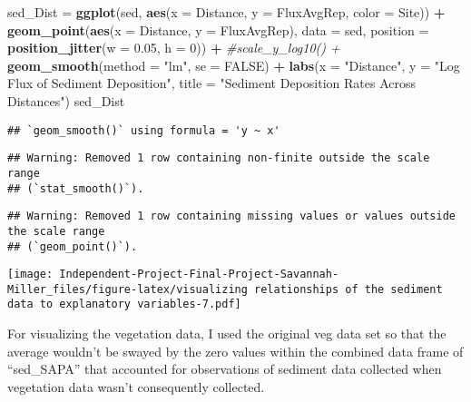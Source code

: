 \documentclass[
]{article}
\newenvironment{Shaded}{\begin{snugshade}}{\end{snugshade}}
\newcommand{\AttributeTok}[1]{\textcolor[rgb]{0.13,0.29,0.53}{#1}}
\newcommand{\CommentTok}[1]{\textcolor[rgb]{0.56,0.35,0.01}{\textit{#1}}}
\newcommand{\ConstantTok}[1]{\textcolor[rgb]{0.56,0.35,0.01}{#1}}
\newcommand{\DecValTok}[1]{\textcolor[rgb]{0.00,0.00,0.81}{#1}}
\newcommand{\FloatTok}[1]{\textcolor[rgb]{0.00,0.00,0.81}{#1}}
\newcommand{\FunctionTok}[1]{\textcolor[rgb]{0.13,0.29,0.53}{\textbf{#1}}}
\newcommand{\NormalTok}[1]{#1}
\newcommand{\OtherTok}[1]{\textcolor[rgb]{0.56,0.35,0.01}{#1}}
\newcommand{\SpecialCharTok}[1]{\textcolor[rgb]{0.81,0.36,0.00}{\textbf{#1}}}
\newcommand{\StringTok}[1]{\textcolor[rgb]{0.31,0.60,0.02}{#1}}
\begin{document}
\begin{Shaded}
\begin{Highlighting}[]
\NormalTok{sed\_Dist }\OtherTok{=} \FunctionTok{ggplot}\NormalTok{(sed, }\FunctionTok{aes}\NormalTok{(}\AttributeTok{x =}\NormalTok{ Distance, }\AttributeTok{y =}\NormalTok{ FluxAvgRep, }\AttributeTok{color =}\NormalTok{ Site)) }\SpecialCharTok{+} 
  \FunctionTok{geom\_point}\NormalTok{(}\FunctionTok{aes}\NormalTok{(}\AttributeTok{x =}\NormalTok{ Distance, }\AttributeTok{y =}\NormalTok{ FluxAvgRep), }\AttributeTok{data =}\NormalTok{ sed, }\AttributeTok{position =} \FunctionTok{position\_jitter}\NormalTok{(}\AttributeTok{w =} \FloatTok{0.05}\NormalTok{, }\AttributeTok{h =} \DecValTok{0}\NormalTok{)) }\SpecialCharTok{+}
  \CommentTok{\#scale\_y\_log10() + }
   \FunctionTok{geom\_smooth}\NormalTok{(}\AttributeTok{method =} \StringTok{"lm"}\NormalTok{, }\AttributeTok{se =} \ConstantTok{FALSE}\NormalTok{) }\SpecialCharTok{+}
  \FunctionTok{labs}\NormalTok{(}\AttributeTok{x =} \StringTok{"Distance"}\NormalTok{, }\AttributeTok{y =} \StringTok{"Log Flux of Sediment Deposition"}\NormalTok{, }
       \AttributeTok{title =} \StringTok{"Sediment Deposition Rates Across Distances"}\NormalTok{)}
\NormalTok{sed\_Dist}
\end{Highlighting}
\end{Shaded}

\begin{verbatim}
## `geom_smooth()` using formula = 'y ~ x'
\end{verbatim}

\begin{verbatim}
## Warning: Removed 1 row containing non-finite outside the scale range
## (`stat_smooth()`).
\end{verbatim}

\begin{verbatim}
## Warning: Removed 1 row containing missing values or values outside the scale range
## (`geom_point()`).
\end{verbatim}

\texttt{[image: Independent-Project-Final-Project-Savannah-Miller\_files/figure-latex/visualizing relationships of the sediment data to explanatory variables-7.pdf]}

For visualizing the vegetation data, I used the original veg data set so
that the average wouldn't be swayed by the zero values within the
combined data frame of ``sed\_SAPA'' that accounted for observations of
sediment data collected when vegetation data wasn't consequently
collected.
\end{document}
